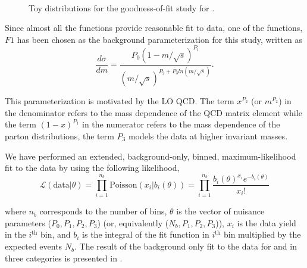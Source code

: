 \begin{figure}[htbp]
\begin{center}
 \\
\caption{Toy distributions for the goodness-of-fit study for \bstar.}
\label{fig:bstarchi2}
\end{center}
\end{figure}

Since almost all the functions provide reasonable fit to data, one of the functions, $F1$ has been chosen as the background parameterization for this study, written as
\begin{equation}
\frac{d{\sigma}}{dm} = \frac{P_{0}(1 - m/{\sqrt{s}})^{P_{1}}}{(m/{\sqrt{s}})^{P_{2} + P_{3} ln(m/{\sqrt{s}})}}.
\label{eq:bkgfun}
\end{equation}

This parameterization is motivated by the LO QCD. The term $x^{P_2}$ (or $m^{P_2}$) in the denominator refers to the mass dependence
of the QCD matrix element while the term $(1 - x)^{P_1}$ in the numerator refers to the mass dependence of the parton distributions,
the term $P_3$ models the data at higher invariant masses. 

We have performed an extended, background-only, binned, maximum-likelihood fit to the data by using the following likelihood,
\begin{equation}
\mathcal{L}(\textrm{data}|\theta) = \prod_{i=1}^{n_{b}}\textrm{Poisson}(x_{i}|b_{i}(\theta)) = \prod_{i=1}^{n_{b}}\frac{{b_{i}(\theta)^{x_{i}}} e^{-b_{i}(\theta)}}{x_{i}!}  
\end{equation}

where $n_b$ corresponds to the number of bins, $\theta$ is the vector of nuisance parameters ($P_0, P_1, P_2, P_3$) (or, equivalently ($N_b, P_1, P_2, P_3$)),
$x_{i}$ is the data yield in the $i^{\textrm{th}}$ bin, and $b_i$ is the integral of the fit function in $i^{\textrm{th}}$ bin multiplied by the expected events $N_b$.
The result of the background only fit to the data for \qstar and \bstar in three categories is presented in \fig{\ref{fig:InvtMassFit}}.

